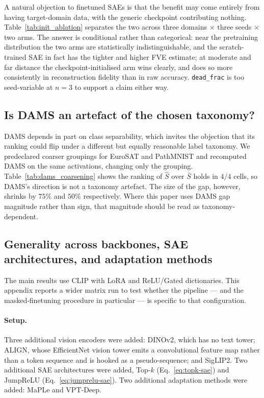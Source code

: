 A natural objection to finetuned SAEs is that the benefit may come entirely from having
target-domain data, with the generic checkpoint contributing nothing.
Table~\ref{tab:init_ablation} separates the two across three domains $\times$ three seeds
$\times$ two arms. The answer is conditional rather than categorical: near the
pretraining distribution the two arms are statistically indistinguishable, and the
scratch-trained SAE in fact has the tighter and higher FVE estimate; at moderate and far
distance the checkpoint-initialised arm wins clearly, and does so more consistently in
reconstruction fidelity than in raw accuracy. \texttt{dead\_frac} is too seed-variable at
$n=3$ to support a claim either way.




\subsection{Is DAMS an artefact of the chosen taxonomy?}
\label{app:dams-coarse}

DAMS depends in part on class separability, which invites the objection that its ranking
could flip under a different but equally reasonable label taxonomy. We predeclared
coarser groupings for EuroSAT and PathMNIST and recomputed DAMS on the same activations,
changing only the grouping. Table~\ref{tab:dams_coarsening} shows the ranking of
$\hat{S}$ over $\bar{S}$ holds in $4/4$ cells, so DAMS's direction is not a taxonomy
artefact. The size of the gap, however, shrinks by $75\%$ and $50\%$ respectively. Where
this paper uses DAMS gap magnitude rather than sign, that magnitude should be read as
taxonomy-dependent.




\subsection{Generality across backbones, SAE architectures, and adaptation methods}
\label{app:generality}

The main results use CLIP with LoRA and ReLU/Gated dictionaries. This appendix reports a
wider matrix run to test whether the pipeline --- and the masked-finetuning procedure in
particular --- is specific to that configuration.

\paragraph{Setup.} Three additional vision encoders were added: DINOv2, which has no
text tower; ALIGN, whose EfficientNet vision tower emits a convolutional feature map
rather than a token sequence and is hooked as a pseudo-sequence; and SigLIP2. Two
additional SAE architectures were added, Top-$k$ (Eq.~\eqref{eq:topk-sae}) and JumpReLU
(Eq.~\eqref{eq:jumprelu-sae}). Two additional adaptation methods were added: MaPLe and
VPT-Deep.

